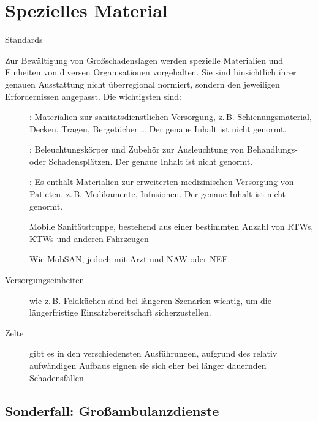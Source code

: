 \section{Spezielles Material}
\label{topic:katastrophe-material}

\Text
{Standards}%
{%
Zur Bewältigung von Großschadenslagen werden spezielle
Materialien und Einheiten von diversen Organisationen
vorgehalten. Sie sind hinsichtlich ihrer genauen Ausstattung
nicht überregional normiert, sondern den jeweiligen
Erfordernissen angepasst. Die wichtigsten sind:

\begin{description}
  \item[] : Materialien zur
  sanitätsdienstlichen Versorgung, z.\,B.
  Schienungsmaterial, Decken, Tragen, Bergetücher {\ldots} Der genaue
  Inhalt ist nicht genormt. 
  \item[] :
  Beleuchtungskörper und Zubehör zur Ausleuchtung von
  Behandlungs- oder Schadensplätzen. Der genaue
  Inhalt ist nicht genormt.
  \item[] : Es
  enthält Materialien zur erweiterten medizinischen Versorgung von
  Patieten, z.\,B. Medikamente, Infusionen. Der genaue
  Inhalt ist nicht genormt.
  \item[] Mobile Sanitätstruppe, bestehend aus
  einer bestimmten Anzahl von RTWs, KTWs und anderen Fahrzeugen
  \item[] Wie MobSAN, jedoch mit Arzt und NAW
  oder NEF
  \item[Versorgungseinheiten] wie z.\,B. Feldküchen sind bei
  längeren Szenarien wichtig, um die längerfristige
  Einsatzbereitschaft sicherzustellen. 
  \item[Zelte] gibt es in den verschiedensten Ausführungen,
  aufgrund des relativ aufwändigen Aufbaus eignen sie sich
  eher bei länger dauernden Schadensfällen
\end{description}}%


\subsection{Sonderfall: Großambulanzdienste}

